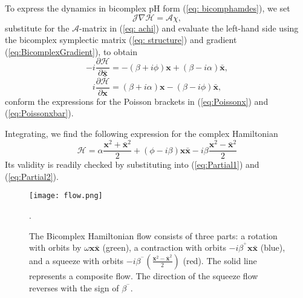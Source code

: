 To express the dynamics in bicomplex pH form (\ref{eq: bicomphamdes}), we set
$$ \mathcal{J}\nabla \mathcal{H}=\mathcal{A}\chi ,
$$
 substitute for the $\mathcal{A}$-matrix in (\ref{eq: achi}) and  evaluate the left-hand side using the bicomplex symplectic matrix (\ref{eq: structure}) and gradient (\ref{eq:BicomplexGradient}), to obtain
\begin{equation}
\label{eq:Partial1}
      -i\frac{\partial \mathcal{H}}{\partial \bar{\textbf{x}}} =  -(\beta+i\phi)\textbf{x} +(\beta-i\alpha)\bar{\textbf{x}},
\end{equation}
\begin{equation}
\label{eq:Partial2}
  i\frac{\partial \bar{\mathcal{H}}}{\partial {\textbf{x}}} =  (\beta+i\alpha)\textbf{x} -(\beta-i\phi)\bar{\textbf{x}},
\end{equation}
conform the expressions for the Poisson brackets in (\ref{eq:Poissonx}) and (\ref{eq:Poissonxbar}).  

Integrating, we find the following expression for the complex Hamiltonian
\begin{equation}
\label{eq: cham}
   \mathcal{H} = \alpha \frac{\textbf{x}^2 +\bar{\textbf{x}}^2}{2}
    +(\phi-i\beta)\textbf{x}\bar{\textbf{x}}-{i{\beta}\frac{\textbf{x}^2-\bar{\textbf{x}}^2}{2}}
\end{equation}
Its validity is readily checked by substituting into (\ref{eq:Partial1}) and (\ref{eq:Partial2}).


\begin{figure}
    \centering
    \texttt{[image: flow.png]}
    \caption{{\small The Bicomplex Hamiltonian flow consists of three parts: a rotation with orbits by $\omega\textbf{x}\bar{\textbf{x}}$ (green), a contraction with orbits $-i\beta^{{}^+}\textbf{x}\bar{\textbf{x}}$ (blue), and a squeeze with orbits $-i\beta^{{}^-} (\frac{\textbf{x}^2-\bar{\textbf{x}}^2}{2})$ (red). The solid line represents a composite flow. The direction of the squeeze flow reverses with the sign of $\beta^{{}^-}$.}}.  
   \label{fig: vec}
\end{figure}

